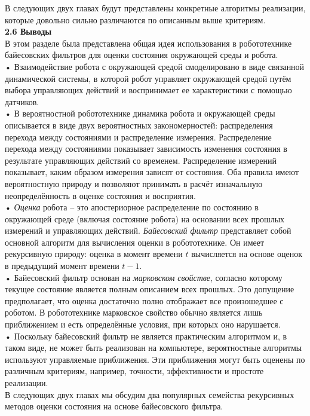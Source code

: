 \documentclass[10pt,a4paper]{article}
\begin{document}
 В следующих двух главах будут представлены конкретные алгоритмы реализации, которые довольно сильно различаются по описанным выше критериям.\\
 
\textbf{ 2.6 Выводы}\\

 В этом разделе была представлена общая идея использования в робототехнике байесовских фильтров для оценки состояния окружающей среды и робота.\\
  
 • Взаимодействие робота с окружающей средой смоделировано в виде связанной динамической системы, в которой робот управляет окружающей средой путём выбора управляющих действий и воспринимает ее характеристики с помощью датчиков.\\
 
 • В вероятностной робототехнике динамика робота и окружающей среды описывается в виде двух вероятностных закономерностей: распределения перехода между состояниями и распределение измерения. Распределение перехода между состояниями показывает зависимость изменения  состояния в результате управляющих действий со временем. Распределение измерений показывает, каким образом измерения зависят от состояния. Оба правила имеют вероятностную природу и позволяют принимать в расчёт изначальную неопределённость в оценке состояния и восприятия.\\
 
 • \textit{Оценка} робота – это апостериорное распределение по состоянию в окружающей среде (включая состояние робота) на основании всех прошлых измерений и управляющих действий. 
 \textit{Байесовский фильтр} представляет собой основной алгоритм для вычисления оценки в робототехнике. Он имеет рекурсивную природу: оценка в момент времени $t$ вычисляется на основе оценок в предыдущий момент времени ${t-1}$.\\
  
 • Байесовский фильтр основан на \textit{марковском свойстве}, согласно которому текущее состояние является полным описанием всех прошлых. Это допущение предполагает, что оценка достаточно полно отображает все произошедшее с роботом. В робототехнике марковское свойство обычно является лишь приближением и есть определённые условия, при которых оно нарушается.\\
 
 • Поскольку байесовский фильтр не является практическим алгоритмом и, в таком виде, не может быть реализован на компьютере, вероятностные алгоритмы используют управляемые приближения. Эти приближения могут быть оценены по различным критериям, например, точности, эффективности и простоте реализации.\\
 В следующих двух главах мы обсудим два популярных семейства рекурсивных методов оценки состояния на основе байесовского фильтра.\\
 
\end{document}
